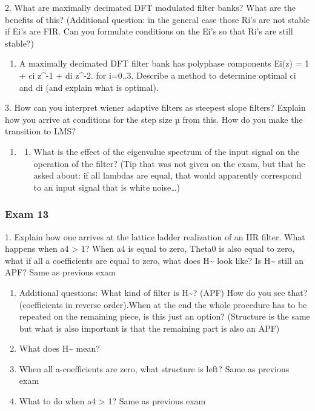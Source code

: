 \documentclass[
  a4paper,
  ,captions=tableheading
]{scrartcl}
\providecommand{\tightlist}{%
  \setlength{\itemsep}{0pt}\setlength{\parskip}{0pt}}
\begin{document}
2. What are maximally decimated DFT modulated filter banks? What are the
benefits of this? (Additional question: in the general case those Ri's
are not stable if Ei's are FIR. Can you formulate conditions on the Ei's
so that Ri's are still stable?)

\begin{enumerate}
\def\labelenumi{\arabic{enumi}.}
\tightlist
\item
  A maximally decimated DFT filter bank has polyphase components Ei(z) =
  1 + ci z\^{}-1 + di z\^{}-2. for i=0..3. Describe a method to
  determine optimal ci and di (and explain what is optimal).
\end{enumerate}

3. How can you interpret wiener adaptive filters as steepest slope
filters? Explain how you arrive at conditions for the step size µ from
this. How do you make the transition to LMS?

\begin{enumerate}
\def\labelenumi{\arabic{enumi}.}
\tightlist
\item
  \begin{enumerate}
  \def\labelenumii{\alph{enumii}.}
  \setcounter{enumii}{1}
  \tightlist
  \item
    What is the effect of the eigenvalue spectrum of the input signal on
    the operation of the filter? (Tip that was not given on the exam,
    but that he asked about: if all lambdas are equal, that would
    apparently correspond to an input signal that is white noise\ldots)
  \end{enumerate}
\end{enumerate}

\subsubsection{Exam 13}\label{exam-13}

1. Explain how one arrives at the lattice ladder realization of an IIR
filter. What happens when \textbar a4\textbar{} \textgreater{} 1? When
a4 is equal to zero, Theta0 is also equal to zero, what if all a
coefficients are equal to zero, what does H\textasciitilde{} look like?
Is H\textasciitilde{} still an APF? Same as previous exam

\begin{enumerate}
\def\labelenumi{\arabic{enumi}.}
\tightlist
\item
  Additional questions: What kind of filter is H\textasciitilde? (APF)
  How do you see that? (coefficients in reverse order).When at the end
  the whole procedure has to be repeated on the remaining piece, is this
  just an option? (Structure is the same but what is also important is
  that the remaining part is also an APF)\\
\item
  What does H\textasciitilde{} mean?\\
\item
  When all a-coefficients are zero, what structure is left? Same as
  previous exam\\
\item
  What to do when \textbar a4\textbar{} \textgreater{} 1? Same as
  previous exam
\end{enumerate}
\end{document}
